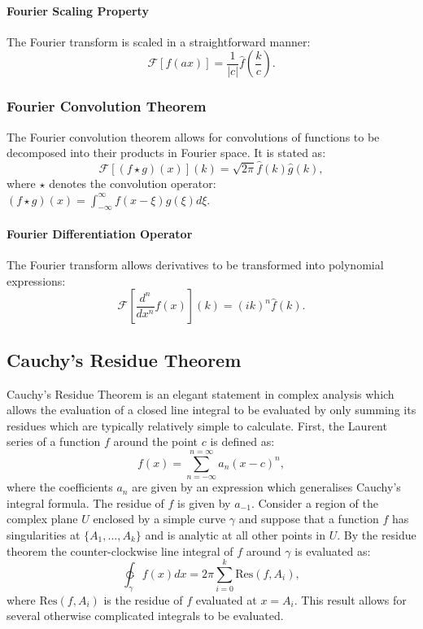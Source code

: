 \paragraph{Fourier Scaling Property}
The Fourier transform is scaled in a straightforward manner:
\begin{equation}
\mathcal{F}[f(a x)] = \frac{1}{|c|}\hat{f}(\frac{k}{c}).
\end{equation}
\subsubsection{Fourier Convolution Theorem}
The Fourier convolution theorem allows for convolutions of functions to be decomposed into their products in Fourier space. It is stated as:
\begin{equation}
\mathcal{F}[(f\star g)(x)](k) = \sqrt{2 \pi}\hat{f}(k) \hat{g}(k),
\end{equation}
where $\star$ denotes the convolution operator: $(f \star g)(x) = \int_{-\infty}^{\infty} f(x-\xi)g(\xi) d \xi$.

\paragraph{Fourier Differentiation Operator}
The Fourier transform allows derivatives to be transformed into polynomial expressions:
\begin{equation}
\mathcal{F}\left[\frac{d^n}{dx^n}f(x)\right](k) = (ik)^n \hat{f}(k).
\end{equation}
\subsection{Cauchy's Residue Theorem}
Cauchy's Residue Theorem is an elegant statement in complex analysis which allows the evaluation of a closed line integral to be evaluated by only summing its residues which are typically relatively simple to calculate. First, the Laurent series of a function $f$ around the point $c$ is defined as:
\begin{equation}
f(x) = \sum_{n=-\infty}^{n=\infty} a_n(x - c)^n,
\end{equation}
where the coefficients $a_n$ are given by an expression which generalises Cauchy's integral formula. The residue of $f$ is given by $a_{-1}$. Consider a region of the complex plane $U$ enclosed by a simple curve $\gamma$ and suppose that a function $f$ has singularities at $\{A_1, ..., A_k\}$ and is analytic at all other points in $U$. By the residue theorem the counter-clockwise line integral of $f$ around $\gamma$ is evaluated as:
\begin{equation}
\ointctrclockwise_\gamma f(x) dx = 2 \pi \sum_{i = 0} ^{k} \text{Res}(f, A_i),
\end{equation}
where $\text{Res}(f, A_i)$ is the residue of $f$ evaluated at $x = A_i$. This result allows for several otherwise complicated integrals to be evaluated.

